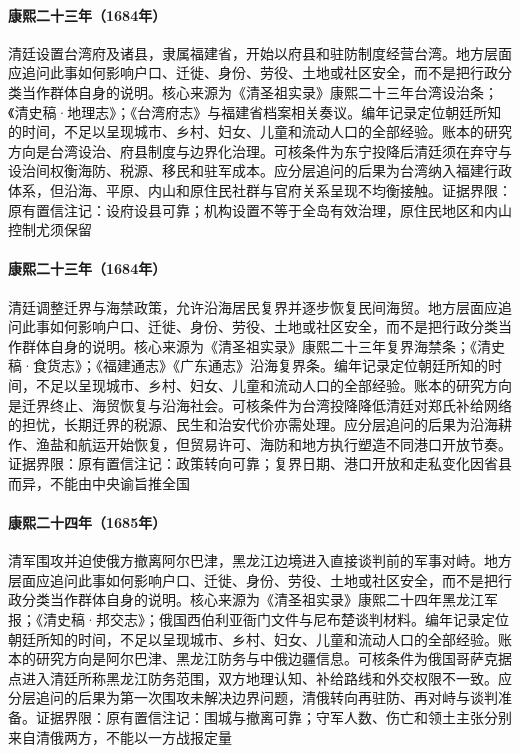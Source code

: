 \hypertarget{social:EQ-1684-TAIWAN-PREFECTURE}{}\paragraph{康熙二十三年（1684年）}清廷设置台湾府及诸县，隶属福建省，开始以府县和驻防制度经营台湾。地方层面应追问此事如何影响户口、迁徙、身份、劳役、土地或社区安全，而不是把行政分类当作群体自身的说明。核心来源为《清圣祖实录》康熙二十三年台湾设治条；《清史稿·地理志》；《台湾府志》与福建省档案相关奏议。编年记录定位朝廷所知的时间，不足以呈现城市、乡村、妇女、儿童和流动人口的全部经验。账本的研究方向是台湾设治、府县制度与边界化治理。可核条件为东宁投降后清廷须在弃守与设治间权衡海防、税源、移民和驻军成本。应分层追问的后果为台湾纳入福建行政体系，但沿海、平原、内山和原住民社群与官府关系呈现不均衡接触。证据界限：原有置信注记：设府设县可靠；机构设置不等于全岛有效治理，原住民地区和内山控制尤须保留
\hypertarget{social:EQ-1684-SEA-BAN-LIFT}{}\paragraph{康熙二十三年（1684年）}清廷调整迁界与海禁政策，允许沿海居民复界并逐步恢复民间海贸。地方层面应追问此事如何影响户口、迁徙、身份、劳役、土地或社区安全，而不是把行政分类当作群体自身的说明。核心来源为《清圣祖实录》康熙二十三年复界海禁条；《清史稿·食货志》；《福建通志》《广东通志》沿海复界条。编年记录定位朝廷所知的时间，不足以呈现城市、乡村、妇女、儿童和流动人口的全部经验。账本的研究方向是迁界终止、海贸恢复与沿海社会。可核条件为台湾投降降低清廷对郑氏补给网络的担忧，长期迁界的税源、民生和治安代价亦需处理。应分层追问的后果为沿海耕作、渔盐和航运开始恢复，但贸易许可、海防和地方执行塑造不同港口开放节奏。证据界限：原有置信注记：政策转向可靠；复界日期、港口开放和走私变化因省县而异，不能由中央谕旨推全国
\hypertarget{social:EQ-1685-ALBAZIN-FIRST}{}\paragraph{康熙二十四年（1685年）}清军围攻并迫使俄方撤离阿尔巴津，黑龙江边境进入直接谈判前的军事对峙。地方层面应追问此事如何影响户口、迁徙、身份、劳役、土地或社区安全，而不是把行政分类当作群体自身的说明。核心来源为《清圣祖实录》康熙二十四年黑龙江军报；《清史稿·邦交志》；俄国西伯利亚衙门文件与尼布楚谈判材料。编年记录定位朝廷所知的时间，不足以呈现城市、乡村、妇女、儿童和流动人口的全部经验。账本的研究方向是阿尔巴津、黑龙江防务与中俄边疆信息。可核条件为俄国哥萨克据点进入清廷所称黑龙江防务范围，双方地理认知、补给路线和外交权限不一致。应分层追问的后果为第一次围攻未解决边界问题，清俄转向再驻防、再对峙与谈判准备。证据界限：原有置信注记：围城与撤离可靠；守军人数、伤亡和领土主张分别来自清俄两方，不能以一方战报定量
